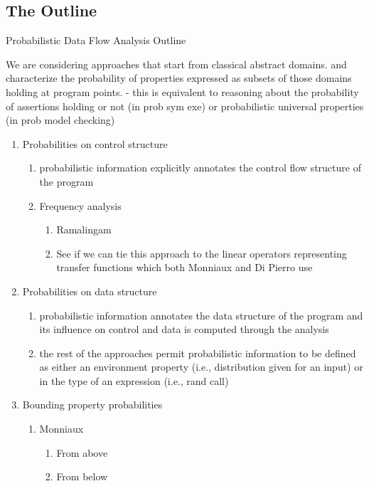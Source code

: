 {\subsection{The Outline}

Probabilistic Data Flow Analysis Outline

We are considering approaches that start from classical abstract domains.
and characterize the probability of properties expressed as subsets
of those domains holding at program points.
  - this is equivalent to reasoning about the probability of assertions
    holding or not (in prob sym exe) or probabilistic universal properties
    (in prob model checking) 

\begin{enumerate}

 \item Probabilities on control structure
   \begin{enumerate}
    \item probabilistic information explicitly annotates the control flow
    structure of the program
    \item Frequency analysis
      \begin{enumerate}
       \item Ramalingam
       \item See if we can tie this approach to the linear
  	  operators representing transfer functions
  	  which both Monniaux and Di Pierro use
      \end{enumerate}
   \end{enumerate}

 \item Probabilities on data structure
   \begin{enumerate}
    \item probabilistic information annotates the data structure of the
    program and its influence on control and data is computed through
    the analysis
    \item the rest of the approaches permit probabilistic information to
    be defined as either an environment property (i.e., distribution
    given for an input) or in the type of an expression (i.e., rand call)
   \end{enumerate}

 \item Bounding property probabilities
   \begin{enumerate}
    \item Monniaux
      \begin{enumerate}
       \item From above
       \item From below
      \end{enumerate}
   \end{enumerate}


\end{enumerate}}
